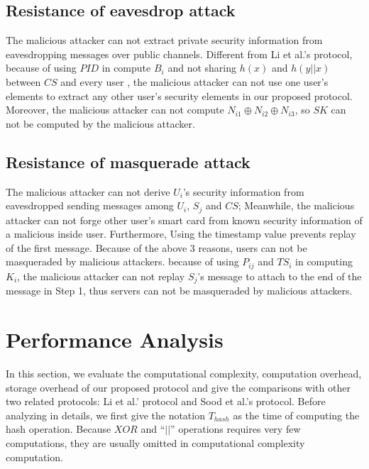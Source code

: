 \documentclass[preprint,12pt]{elsarticle}
\begin{document}
\subsection{Resistance of eavesdrop attack}
The malicious attacker can not extract private security information from eavesdropping messages over public channels. Different from Li et al.'s protocol, because of using $PID$ in compute $B_i$ and not sharing $h(x)$ and $h(y||x)$ between $CS$ and every user , the malicious attacker can not use one user's elements to extract any other user's security elements in our proposed protocol. Moreover, the malicious attacker can not compute $N_{i1}\oplus N_{i2}\oplus N_{i3}$, so $SK$ can not be computed by the malicious attacker.

\subsection{Resistance of masquerade attack}
The malicious attacker can not derive $U_i$'s security information from eavesdropped sending messages among $U_i$, $S_j$ and $CS$; Meanwhile, the malicious attacker can not forge other user's smart card from known security information of a malicious inside user. Furthermore, Using the timestamp value prevents replay of the first message. Because of the above 3 reasons, users can not be masqueraded by malicious attackers. because of using $P_{ij}$ and $TS_i$ in computing $K_i$, the malicious attacker can not replay $S_j$'s message to attach to  the end of the message in Step 1, thus servers can not be masqueraded by malicious attackers.


\section{Performance Analysis}
In this section, we evaluate the computational complexity, computation overhead, storage overhead of our proposed protocol and give the comparisons with other two related protocols: Li et al.' protocol\cite{passwd-based-multi7} and Sood et al.'s protocol\cite{passwd-based-multi2}. Before analyzing in details, we first give the notation $T_{hash}$ as the time of computing the hash operation. Because $XOR$ and ``$||$'' operations requires very few computations, they are usually omitted in computational complexity computation.
\begin{table}[h]
\centering
\caption{Computational complexity comparison of our protocol and two other related protocols}
\end{table}
\end{document}
